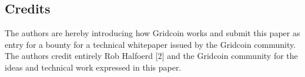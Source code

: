 \subsection{Credits}
\label{sec:credits}

The authors are hereby introducing how Gridcoin works and submit this paper as entry for a bounty for a technical whitepaper issued by the Gridcoin community. The authors credit entirely Rob Halfoerd [2] and the Gridcoin community for the ideas and technical work expressed in this paper.